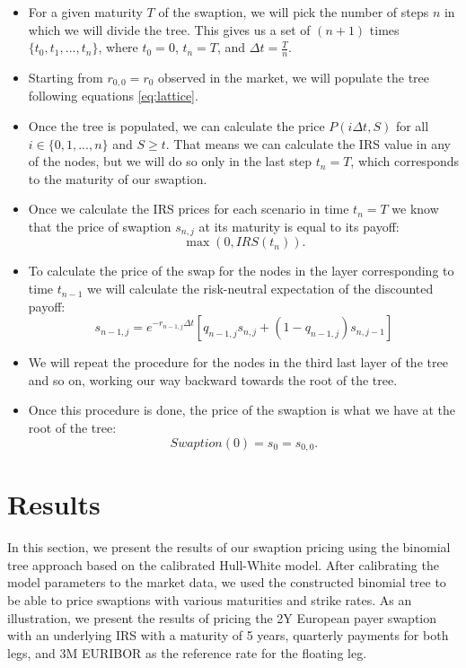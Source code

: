 \documentclass[titlepage, 12pt]{article}
\begin{document}
	\begin{itemize}
		\item For a given maturity $T$ of the swaption, we will pick the number of steps $n$ in which we will divide the tree. This gives us a set of $(n+1)$ times $\{t_0, t_1,...,t_n\}$, where $t_0 = 0$, $t_n=T$, and $\Delta t=\frac{T}{n}$.
		\item Starting from $r_{0,0}=r_0$ observed in the market, we will populate the tree following equations \eqref{eq:lattice}.
		\item Once the tree is populated, we can calculate the price $P(i\Delta t,S)$ for all $i\in\{0,1,...,n\}$ and $S\geq t$. That means we can calculate the IRS value in any of the nodes, but we will do so only in the last step $t_n=T$, which corresponds to the maturity of our swaption.
		\item Once we calculate the IRS prices for each scenario in time $t_n=T$ we know that the price of swaption $s_{n,j}$ at its maturity is equal to its payoff: $$\max(0,IRS(t_n)).$$
		\item To calculate the price of the swap for the nodes in the layer corresponding to time $t_{n-1}$ we will calculate the risk-neutral expectation of the discounted payoff:
		\begin{equation}
			s_{n-1,j} = e^{-r_{n-1,j}\Delta t }\left[ q_{n-1,j}s_{n,j} + (1-q_{n-1,j})s_{n,j-1} \right]
		\end{equation}
		\item We will repeat the procedure for the nodes in the third last layer of the tree and so on, working our way backward towards the root of the tree.
		\item Once this procedure is done, the price of the swaption is what we have at the root of the tree: $$Swaption(0)=s_0=s_{0,0}.$$
	\end{itemize}
	
	\section{Results}\label{results}
	
	In this section, we present the results of our swaption pricing using the binomial tree approach based on the calibrated Hull-White model. After calibrating the model parameters to the market data, we used the constructed binomial tree to be able to price swaptions with various maturities and strike rates. As an illustration, we present the results of pricing the 2Y European payer swaption with an underlying IRS with a maturity of 5 years, quarterly payments for both legs, and 3M EURIBOR as the reference rate for the floating leg.
	
\end{document}
